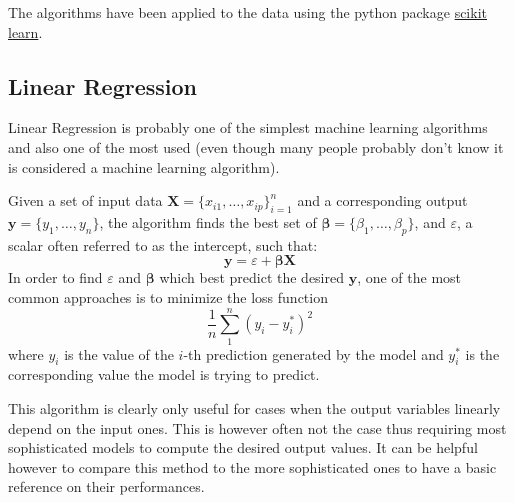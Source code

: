 The algorithms have been applied to the data using the python package \href{https://scikit-learn.org/}{scikit learn}\citep{scikit}.
\subsection{Linear Regression}\label{linearregr}
Linear Regression is probably one of the simplest machine learning algorithms and also one of the most used (even though many people probably don't know it is considered a machine learning algorithm).

Given a set of input data $\bm{X} = \{x_{i1},\ldots ,x_{ip}\}_{i=1}^{n}$ and a corresponding output $\mathbf{y} = \{y_{1},\ldots ,y_{n}\}$, the algorithm finds the best set of $\bm{\beta} = \{\beta_{1},\ldots ,\beta_{p}\}$, and $\varepsilon$, a scalar often referred to as the intercept, such that:
\begin{equation}\label{eq:linear}
\mathbf {y} = \varepsilon + \bm{\beta}\bm{X}
\end{equation}
In order to find $\varepsilon$ and $\bm{\beta}$ which best predict the desired $\mathbf {y}$, one of the most common approaches is to minimize the loss function
\begin{equation}
\frac{1}{n}\sum_{1}^{n}(y_i-y^*_i)^2
\end{equation}
where $y_i$ is the value of the $i$-th prediction generated by the model and $y^*_i$ is the corresponding value the model is trying to predict.

This algorithm is clearly only useful for cases when the output variables linearly depend on the input ones. This is however often not the case thus requiring most sophisticated models to compute the desired output values. It can be helpful however to compare this method to the more sophisticated ones to have a basic reference on their performances.

